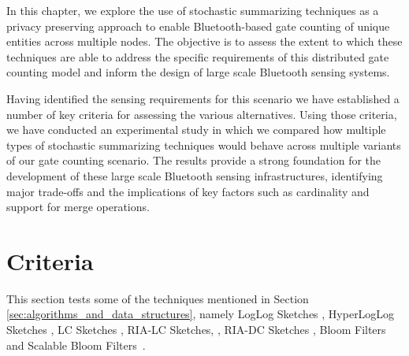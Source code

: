 In this chapter, we explore the use of stochastic summarizing
techniques as a privacy preserving approach to enable Bluetooth-based
gate counting of unique entities across multiple nodes. The objective
is to assess the extent to which these techniques are able to address the
specific requirements of this distributed gate counting model and
inform the design of large scale Bluetooth sensing systems.

Having identified the sensing requirements for this scenario we have
established a number of key criteria for assessing the various
alternatives. Using those criteria, we have conducted an
experimental study in which we compared how multiple types of
stochastic summarizing techniques would behave across multiple
variants of our gate counting scenario. The results provide a strong
foundation for the development of these large scale Bluetooth sensing
infrastructures, identifying major trade-offs and the implications of
key factors such as cardinality and support for merge operations.




\section{Criteria}
\label{sec:Criteria}

This section tests some of the techniques mentioned in Section
\ref{sec:algorithms_and_data_structures}, namely LogLog Sketches
\cite{Durand:2003tc}, HyperLogLog Sketches \cite{Fusy:2007um}, LC
Sketches \cite{Whang:1990uh}, RIA-LC Sketches, 
\cite{Fan:2008wl,YaoChungFanArbeeLPChen:2010to}, RIA-DC Sketches
\cite{YaoChungFanArbeeLPChen:2010to}, Bloom Filters~\cite{Bloom1970}
and Scalable Bloom Filters~\cite{Almeida2007}. 

